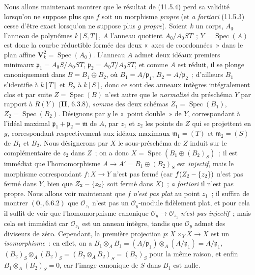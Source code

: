 \begin{env}[11.7.2]
\label{IV.11.7.2-fr}
Nous allons maintenant montrer que le résultat de (11.5.4) perd sa validité
lorsqu'on ne suppose plus que $f$ soit un morphisme \emph{propre} (et
\emph{a fortiori} (11.5.3) cesse d'être exact lorsqu'on ne suppose plus $g$
\emph{propre}). Soient $k$ un corps, $A_0$ l'anneau de polynômes $k[S,T]$, $A$
l'anneau quotient $A_0/A_0ST$~; $Y=\operatorname{Spec}(A)$ est donc la courbe
réductible formée des deux «~axes de coordonnées~» dans le plan affine
$\mathbf V_k^2=\operatorname{Spec}(A_0)$. L'anneau $A$ admet deux idéaux premiers
minimaux $\mathfrak p_1=A_0S/A_0ST$, $\mathfrak p_2=A_0T/A_0ST$, et comme $A$
est réduit, il se plonge canoniquement dans $B=B_1\oplus B_2$, où
$B_1=A/\mathfrak p_1$, $B_2=A/\mathfrak p_2$~; d'ailleurs $B_1$ s'identifie à
$k[T]$ et $B_2$ à $k[S]$, donc ce sont des anneaux intègres intégralement clos
et par suite $Z=\operatorname{Spec}(B)$ n'est autre que le \emph{normalisé} du
préschéma $Y$ par rapport à $R(Y)$ (\textbf{II}, 6.3.8), \emph{somme} des deux schémas
$Z_1=\operatorname{Spec}(B_1)$, $Z_2=\operatorname{Spec}(B_2)$. Désignons par
$y$ le «~point double~» de $Y$, correspondant à l'idéal maximal
$\mathfrak p_1+\mathfrak p_2=\mathfrak m$ de $A$, par $z_1$ et $z_2$ les
points de $Z$ qui se projettent en $y$, correspondant respectivement aux idéaux
maximaux $\mathfrak m_1=(T)$ et $\mathfrak m_2=(S)$ de $B_1$ et $B_2$. Nous
désignerons par $X$ le sous-préschéma de $Z$ induit sur le complémentaire de
$z_2$ dans $Z$~; on a donc
$X=\operatorname{Spec}(B_1\oplus(B_2)_S)$~; il est immédiat que
l'homomorphisme $A\to A'=B_1\oplus(B_2)_S$ est \emph{injectif}, mais le morphisme
correspondant $f:X\to Y$ n'est pas fermé (car $f(Z_2-\{z_2\})$ n'est pas fermé
dans $Y$, bien que $Z_2-\{z_2\}$ soit fermé dans $X$)~; \emph{a fortiori} il
n'est pas propre. Nous allons voir maintenant que $f$ \emph{n'est pas plat} au point
$z_1$~; il suffira de montrer $(\mathbf 0_{\mathrm I},6.6.2)$ que
$\mathcal O_{z_1}$ n'est pas un $\mathcal O_y$-module fidèlement plat, et pour
cela il suffit de voir que l'homomorphisme canonique
$\mathcal O_y\to\mathcal O_{z_1}$ \emph{n'est pas injectif}~; mais cela est immédiat
car $\mathcal O_{z_1}$ est un anneau intègre, tandis que $\mathcal O_y$ admet
des diviseurs de zéro. Cependant, la première projection
$p:X\times_Y X\to X$ est un \emph{isomorphisme}~: en effet, on a
$B_1\otimes_A B_1=(A/\mathfrak p_1)\otimes_A(A/\mathfrak p_1)=A/\mathfrak p_1$,
$(B_2)_S\otimes_A(B_2)_S=(B_2\otimes_A B_2)_S=(B_2)_S$ pour la même raison,
et enfin $B_1\otimes_A(B_2)_S=0$, car l'image canonique de $S$ dans $B_1$ est
nulle.
\end{env}

